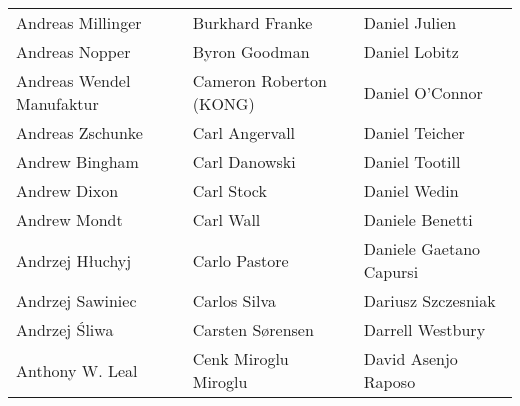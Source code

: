\begin{tabular}{p{4.5cm}p{4.5cm}p{4.5cm}}
Andreas Millinger & Burkhard Franke & Daniel Julien \\
Andreas Nopper & Byron Goodman & Daniel Lobitz \\
Andreas Wendel Manufaktur & Cameron Roberton (KONG) & Daniel O'Connor \\
Andreas Zschunke & Carl Angervall & Daniel Teicher \\
Andrew Bingham & Carl Danowski & Daniel Tootill \\
Andrew Dixon & Carl Stock & Daniel Wedin \\
Andrew Mondt & Carl Wall & Daniele Benetti \\
Andrzej Hłuchyj & Carlo Pastore & Daniele Gaetano Capursi \\
Andrzej Sawiniec & Carlos Silva & Dariusz Szczesniak \\
Andrzej Śliwa & Carsten Sørensen & Darrell Westbury \\
Anthony W. Leal & Cenk Miroglu Miroglu & David Asenjo Raposo \\
\end{tabular}
\newpage
\setlength{\tabcolsep}{1mm}
